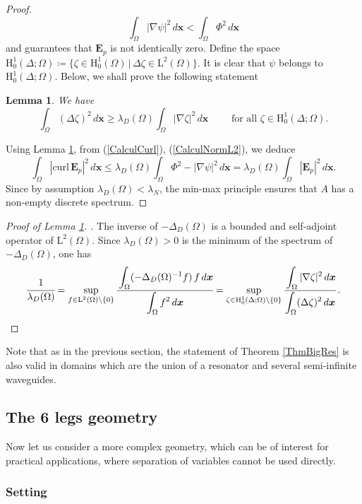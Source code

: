 \documentclass[11pt,a4paper]{article}
\newcommand{\dsp}{\displaystyle}
\newcommand{\Om}{\Omega}
\newcommand{\mrm}[1]{\mathrm{#1}}
\newcommand{\bfx}{\boldsymbol{x}}
\newcommand{\mL}{\mrm{L}}
\newcommand{\mH}{\mrm{H}}
\newcommand{\curlvec}{\boldsymbol{\mrm{curl}}\,}
\def\E{\boldsymbol{E}}
\newtheorem{lemma}[theorem]{Lemma}
\begin{document}
\begin{proof}
\[
\dsp\int_{\Om}|\nabla\psi|^2\,d\bfx < \dsp\int_{\Om}\Phi^2 \,d\bfx
\]
and guarantees that $\E_p$ is not identically zero. Define the space $\mH^1_0(\Delta;\Om)\coloneqq\{\zeta\in\mH^1_0(\Om)\,|\,\Delta\zeta\in\mL^2(\Om)\}$. It is clear that $\psi$ belongs to $\mH^1_0(\Delta;\Om)$. Below, we shall prove the following statement
\begin{lemma}\label{EstimMin}
We have 
\[
\int_{\Om}(\Delta\zeta)^2\,d\bfx \ge \lambda_D(\Om)\int_{\Om}|\nabla\zeta|^2\,d\bfx\qquad\mbox{ for all }\zeta\in\mH^1_0(\Delta;\Om).
\]
\end{lemma}
\noindent Using Lemma \ref{EstimMin}, from (\ref{CalculCurl}), (\ref{CalculNormL2}), we deduce
\[
\dsp\int_{\Om}|\curlvec\E_p|^2\,d\bfx \le \lambda_D(\Om) \dsp\int_{\Om}\Phi^2-|\nabla\psi|^2\,d\bfx = \lambda_D(\Om)
\dsp\int_{\Om}|\E_p|^2\,d\bfx.
\]
Since by assumption $\lambda_D(\Om)<\lambda_N$, the min-max principle ensures that $A$ has a non-empty discrete spectrum.
\end{proof}
\begin{proof}[Proof of Lemma \ref{EstimMin}. ] The inverse of $-\Delta_D(\Om)$ is 
a bounded and self-adjoint operator of $\mL^2(\Om)$. Since $\lambda_D(\Om)>0$ is the minimum of the spectrum of $-\Delta_D(\Om)$, one has 
\[
\cfrac{1}{\lambda_D(\Om)}=\sup_{f\in\mL^2(\Om)\setminus\{0\}} \cfrac{\dsp\int_{\Om} (-\Delta_D(\Om)^{-1}f)\,f\,d\bfx}{\dsp\int_{\Om}f^2\,d\bfx}=\sup_{\zeta\in\mH^1_0(\Delta;\Om)\setminus\{0\}} \cfrac{\dsp\int_{\Om}|\nabla\zeta|^2\,d\bfx}{\dsp\int_{\Om}(\Delta\zeta)^2\,d\bfx}\,.
\]  
\end{proof}
\noindent Note that as in the previous section, the statement of Theorem \ref{ThmBigRes} is also valid in domains which are the union of a resonator and several semi-infinite waveguides.


\subsection{The 6 legs geometry }\label{Para6legs}

Now let us consider a more complex geometry, which can be of interest for practical applications, where separation of variables cannot be used directly. 

\subsubsection*{Setting}
\end{document}
